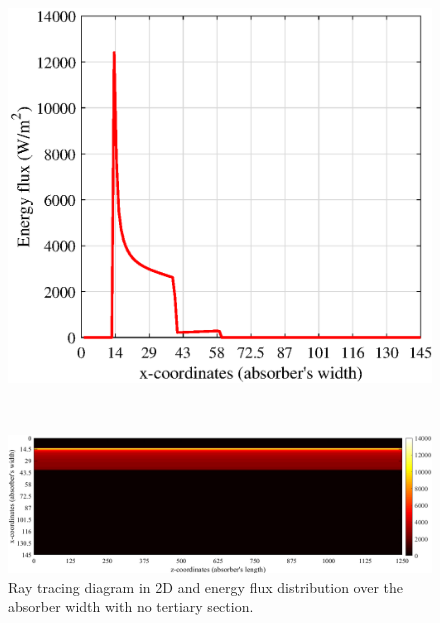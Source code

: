 \begin{figure}[ht!]
\begin{minipage}{0.48\columnwidth}
	\end{minipage}
	\begin{minipage}{0.48\columnwidth}
		\includegraphics[scale=0.48]{figs/Energy2D-hts0.eps}
	\end{minipage}
\\[3mm]
	\begin{minipage}{1.0\columnwidth}
	\includegraphics[scale=0.41]{figs/Energy3D-hts0.png}
	\end{minipage}

	\caption{Ray tracing diagram in 2D and energy flux distribution over the absorber width with no tertiary section.}
	\label{Tertiary-hts0}
\end{figure}

